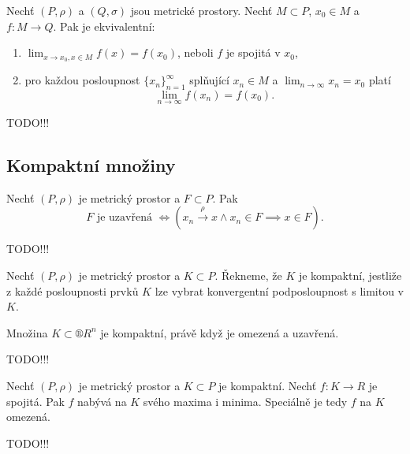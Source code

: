 \documentclass[12pt]{article}					%
\begin{document}
	\begin{veta}[Heine]
		Nechť $(P, \rho)$ a $(Q, \sigma)$ jsou metrické prostory. Nechť $M \subset P$, $x_0 \in M$ a $f: M \rightarrow Q$. Pak je ekvivalentní:

		\begin{enumerate}
			\item $\lim_{x \rightarrow x_0, x \in M} f(x) = f(x_0)$, neboli $f$ je spojitá v $x_0$,
			\item pro každou posloupnost $\{x_n\}_{n=1}^∞$ splňující $x_n \in M$ a $\lim_{n \rightarrow ∞} x_n = x_0$ platí
				$$ \lim_{n \rightarrow ∞} f(x_n) = f(x_0). $$
		\end{enumerate}

		\begin{dukazin}
			TODO!!!
		\end{dukazin}
	\end{veta}

\subsection{Kompaktní množiny}
	\begin{veta}
		Nechť $(P, \rho)$ je metrický prostor a $F \subset P$. Pak
		$$ F \text{ je uzavřená } \Leftrightarrow (x_n \overset{\rho}{\rightarrow} x \land x_n \in F \implies x \in F). $$

		\begin{dukazin}
			TODO!!!
		\end{dukazin}
	\end{veta}

	\begin{definice}
		Nechť $(P, \rho)$ je metrický prostor a $K \subset P$. Řekneme, že $K$ je kompaktní, jestliže z každé posloupnosti prvků $K$ lze vybrat konvergentní podposloupnost s limitou v $K$.
	\end{definice}

	\begin{veta}
		Množina $K \subset ®R^n$ je kompaktní, právě když je omezená a uzavřená.

		\begin{dukazin}
			TODO!!!
		\end{dukazin}
	\end{veta}

	\begin{veta}
		Nechť $(P, \rho)$ je metrický prostor a $K \subset P$ je kompaktní. Nechť $f: K \rightarrow R$ je spojitá. Pak $f$ nabývá na $K$ svého maxima i minima. Speciálně je tedy $f$ na $K$ omezená.

		\begin{dukazin}
			TODO!!!
		\end{dukazin}
	\end{veta}
\end{document}
